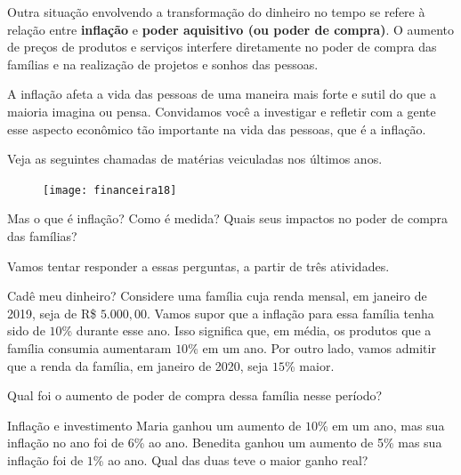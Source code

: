 Outra situação envolvendo a transformação do dinheiro no tempo se refere à relação entre \textbf{inflação} e \textbf{poder aquisitivo (ou poder de compra)}. O aumento de preços de produtos e serviços interfere diretamente no poder de compra das famílias e na realização de projetos e sonhos das pessoas.

A inflação afeta a vida das pessoas de uma maneira mais forte e sutil do que a maioria imagina ou pensa. Convidamos você a investigar e refletir com a gente esse aspecto econômico tão importante na vida das pessoas, que é a inflação.

Veja as seguintes chamadas de matérias veiculadas nos últimos anos.

\begin{figure}[H]
\centering

\texttt{[image: financeira18]}
\end{figure}

Mas o que é inflação? Como é medida? Quais seus impactos no poder de compra das famílias?

Vamos tentar responder a essas perguntas, a partir de três atividades.

\begin{task}{Cadê meu dinheiro?}
Considere uma família cuja renda mensal, em janeiro de 2019, seja de R\$ $5.000{,}00$. Vamos supor que a inflação para essa família tenha sido de $10$\% durante esse ano. Isso significa que, em média, os produtos que a família consumia aumentaram $10$\% em um ano. Por outro lado, vamos admitir que a renda da família, em janeiro de 2020, seja $15$\% maior.

Qual foi o aumento de poder de compra dessa família nesse período?
\end{task}

\begin{task}{Inflação e investimento}
Maria ganhou um aumento de $10$\% em um ano, mas sua inflação no ano foi de $6$\% ao ano. Benedita ganhou um aumento de 5\% mas sua inflação foi de $1$\% ao ano. Qual das duas teve o maior ganho real?
\end{task}

